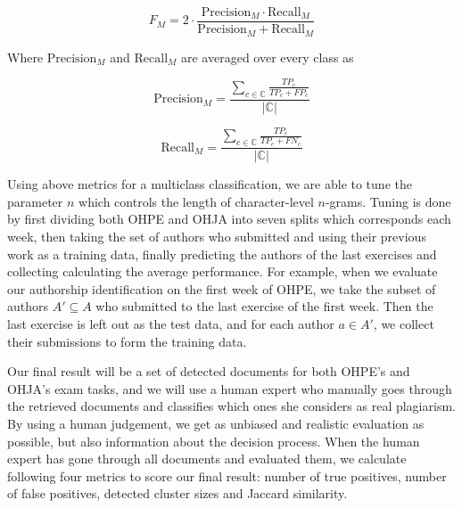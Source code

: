\begin{equation}
    F_M = 2 \cdot \dfrac{\text{Precision}_M \cdot \text{Recall}_M}{\text{Precision}_M + \text{Recall}_M}
\end{equation}

\noindent
Where $\text{Precision}_M$ and $\text{Recall}_M$ are averaged over every class as

\begin{equation}
    \text{Precision}_M = \dfrac{\sum \limits_{c \in \mathbb{C}}
        \frac{TP_c}
             {TP_c + FP_c}}
    {|\mathbb{C}|}
\end{equation}

\begin{equation}
    \text{Recall}_M = \dfrac{\sum \limits_{c \in \mathbb{C}}
        \frac{TP_c}
             {TP_c + FN_c}}
    {|\mathbb{C}|}
\end{equation}



\noindent
Using above metrics for a multiclass classification, we are able to tune the parameter $n$ which controls the length of character-level $n$-grams. Tuning is done by first dividing both OHPE and OHJA into seven splits which corresponds each week, then taking the set of authors who submitted and using their previous work as a training data, finally predicting the authors of the last exercises and collecting calculating the average performance. For example, when we evaluate our authorship identification on the first week of OHPE, we take the subset of authors $A' \subseteq A$ who submitted to the last exercise of the first week. Then the last exercise is left out as the test data, and for each author $a \in A'$, we collect their submissions to form the training data. 


Our final result will be a set of detected documents for both OHPE's and OHJA's exam tasks, and we will use a human expert who manually goes through the retrieved documents and classifies which ones she considers as real plagiarism. By using a human judgement, we get as unbiased and realistic evaluation as possible, but also information about the decision process. When the human expert has gone through all documents and evaluated them, we calculate following four metrics to score our final result: number of true positives, number of false positives, detected cluster sizes and Jaccard similarity. 
